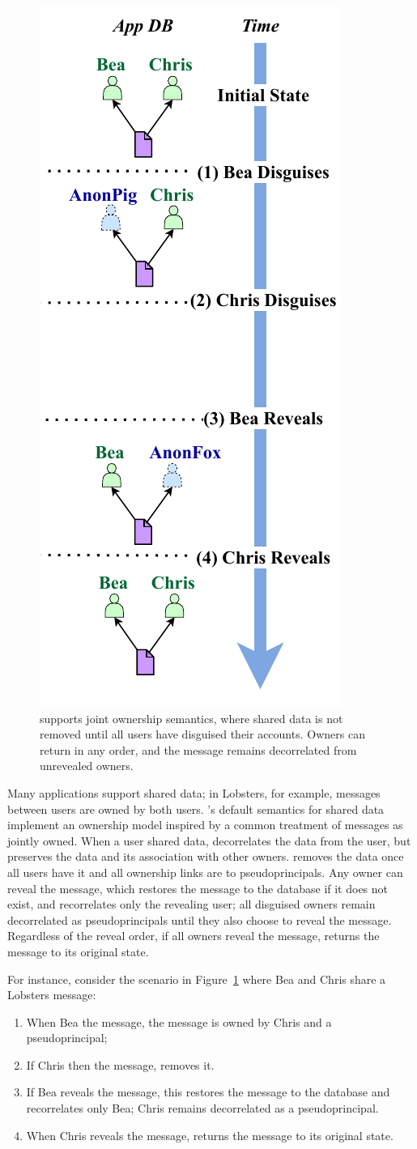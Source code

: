 \begin{figure}
    \centering
    \includegraphics[width=.4\textwidth]{figs/shared_hl}
  \caption{\sys supports joint ownership semantics, where shared data is not
    removed until all users have disguised their accounts. Owners can return in
    any order, and the message remains decorrelated from unrevealed owners.}
\label{f:shared:hl}
\end{figure}


%
Many applications support shared data; in Lobsters, for example, messages
between users are owned by both users.
%
\sys's default semantics for shared data implement an ownership model inspired
by a common treatment of messages as jointly owned.
%
When a user \xxs shared data, \sys decorrelates the data from the \xxing user,
but preserves the data and its association with other owners.
%
\sys removes the data once all users have \xxed it and all ownership links are
to pseudoprincipals.
%
Any owner can reveal the message, which restores the message to the database if
it does not exist, and recorrelates only the revealing user; all disguised
owners remain decorrelated as pseudoprincipals until they also choose to reveal the message.
%
Regardless of the reveal order, if all owners reveal the message, \sys returns
the message to its original state.

%
For instance, consider the scenario in Figure~\ref{f:shared:hl} where Bea and
Chris share a Lobsters message:
\begin{enumerate}[nosep]
    \item[(1)] When Bea \xxs the message, the message is owned by
Chris and a pseudoprincipal;
    \item[(2)] If Chris then \xxs the message, \sys removes it.
    \item[(3)] If Bea reveals the message, this restores the message to the database
and recorrelates only Bea; Chris remains decorrelated as a pseudoprincipal.
\item[(4)] When Chris reveals the message, \sys returns
the message to its original state.
\end{enumerate}
%

